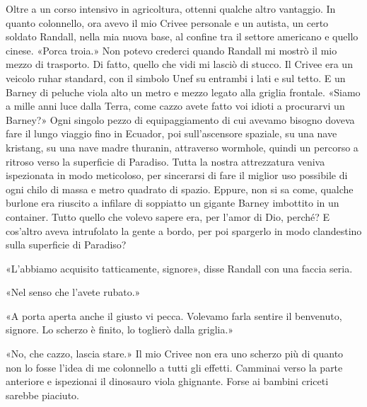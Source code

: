 Oltre a un corso intensivo in agricoltura, ottenni qualche altro
vantaggio. In quanto colonnello, ora avevo il mio Crivee personale e un
autista, un certo soldato Randall, nella mia nuova base, al confine tra
il settore americano e quello cinese. «Porca troia.» Non potevo crederci
quando Randall mi mostrò il mio mezzo di trasporto. Di fatto, quello che
vidi mi lasciò di stucco. Il Crivee era un veicolo ruhar standard, con
il simbolo Unef su entrambi i lati e sul tetto. E un Barney di peluche
viola alto un metro e mezzo legato alla griglia frontale. «Siamo a mille
anni luce dalla Terra, come cazzo avete fatto voi idioti a procurarvi un
Barney?» Ogni singolo pezzo di equipaggiamento di cui avevamo bisogno
doveva fare il lungo viaggio fino in Ecuador, poi sull'ascensore
spaziale, su una nave kristang, su una nave madre thuranin, attraverso
wormhole, quindi un percorso a ritroso verso la superficie di Paradiso.
Tutta la nostra attrezzatura veniva ispezionata in modo meticoloso, per
sincerarsi di fare il miglior uso possibile di ogni chilo di massa e
metro quadrato di spazio. Eppure, non si sa come, qualche burlone era
riuscito a infilare di soppiatto un gigante Barney imbottito in un
container. Tutto quello che volevo sapere era, per l'amor di Dio,
perché? E cos'altro aveva intrufolato la gente a bordo, per poi
spargerlo in modo clandestino sulla superficie di Paradiso?

«L'abbiamo acquisito tatticamente, signore», disse Randall con una
faccia seria.

«Nel senso che l'avete rubato.»

«A porta aperta anche il giusto vi pecca. Volevamo farla sentire il
benvenuto, signore. Lo scherzo è finito, lo toglierò dalla griglia.»

«No, che cazzo, lascia stare.» Il mio Crivee non era uno scherzo più di
quanto non lo fosse l'idea di me colonnello a tutti gli effetti.
Camminai verso la parte anteriore e ispezionai il dinosauro viola
ghignante. Forse ai bambini criceti sarebbe piaciuto.

\hfill\break

